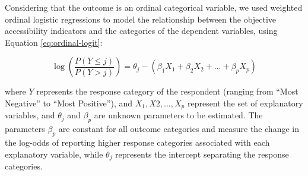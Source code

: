 \documentclass[preprint, 3p,
authoryear]{elsarticle} %
\begin{document}
Considering that the outcome is an ordinal categorical variable, we used
weighted ordinal logistic regressions \citep{lumley2011} to model the
relationship between the objective accessibility indicators and the
categories of the dependent variables, using Equation
\ref{eq:ordinal-logit}:

\begin{equation}
\label{eq:ordinal-logit}
\log(\frac{P(Y\le j)}{P(Y > j)}) = \theta_j - (\beta_1 X_1 + \beta_2 X_2 + ... + \beta_p X_p)
\end{equation}

\noindent where \(Y\) represents the response category of the respondent
(ranging from ``Most Negative'' to ``Most Positive''), and
\(X_1, X2, ..., X_p\) represent the set of explanatory variables, and
\(\theta_j\) and \(\beta_p\) are unknown parameters to be estimated. The
parameters \(\beta_p\) are constant for all outcome categories and
measure the change in the log-odds of reporting higher response
categories associated with each explanatory variable, while \(\theta_j\)
represents the intercept separating the response categories.
\end{document}
